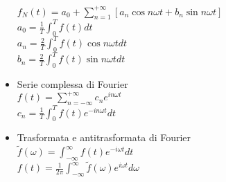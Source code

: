 \documentclass[a4paper]{article}
\begin{document}
\begin{itemize}
		$f_N(t)=a_0+\sum_{n=1}^{+ \infty} [a_n \cos n \omega t+b_n \sin n \omega t]$\\
		$a_0 = \frac{1}{T} \int_{0}^{T} f(t) dt$\\
		$a_n = \frac{2}{T} \int_{0}^{T} f(t) \cos n \omega t dt$\\
		$b_n = \frac{2}{T} \int_{0}^{T} f(t) \sin n \omega t dt$
		\item Serie complessa di Fourier\\
		$f(t)=\sum_{n=-\infty}^{+ \infty} c_n e^{in \omega t}$\\
		$c_n=\frac{1}{T} \int_{0}^{T} f(t) e^{-in \omega t}dt$
		\item Trasformata e antitrasformata di Fourier\\
		$\tilde{f}(\omega)=\int_{-\infty}^{\infty} f(t) e^{-i \omega t} dt$\\
		$f(t)=\frac{1}{2 \pi} \int_{-\infty}^{\infty} \tilde{f}(\omega) e^{i \omega t} d\omega$
		
		
	\end{itemize}
	
\end{document}

